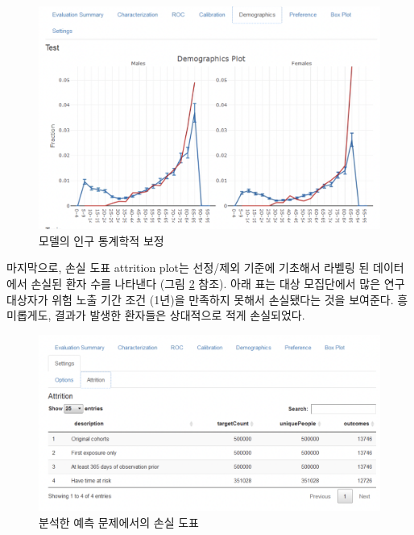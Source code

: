 \documentclass[10.5pt]{book}
\theoremstyle{definition}
\theoremstyle{definition}
\theoremstyle{definition}
\theoremstyle{remark}
\begin{document}
\begin{figure}

{\centering \includegraphics[width=1\linewidth]{images/PatientLevelPrediction/shiny/singleShiny/singleShinyDemo} 

}

\caption{모델의 인구 통계학적 보정}\label{fig:shinyDemo}
\end{figure}

마지막으로, 손실 도표 attrition plot는 선정/제외 기준에 기초해서 라벨링
된 데이터에서 손실된 환자 수를 나타낸다 (그림 \ref{fig:shinyAtt} 참조).
아래 표는 대상 모집단에서 많은 연구대상자가 위험 노출 기간 조건 (1년)을
만족하지 못해서 손실됐다는 것을 보여준다. 흥미롭게도, 결과가 발생한
환자들은 상대적으로 적게 손실되었다.

\begin{figure}

{\centering \includegraphics[width=1\linewidth]{images/PatientLevelPrediction/shiny/singleShiny/singleShinyAtt} 

}

\caption{분석한 예측 문제에서의 손실 도표}\label{fig:shinyAtt}
\end{figure}
\end{document}
